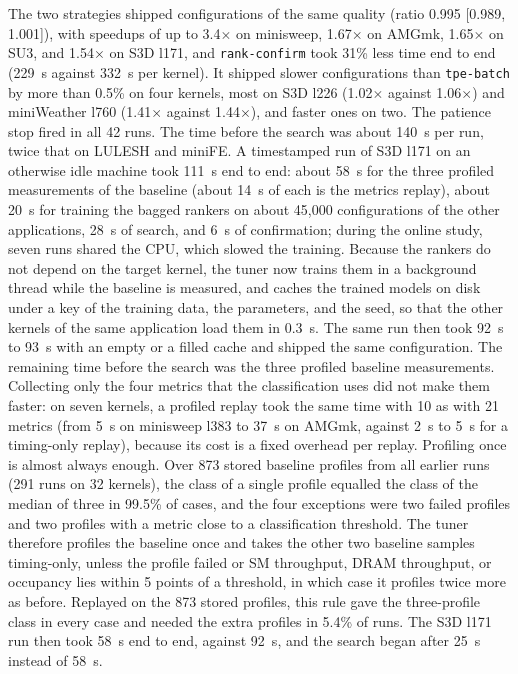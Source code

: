 \documentclass[10pt]{article}
\newcommand{\x}{\ensuremath{\times}}
\newcommand{\code}[1]{\texttt{#1}}
\begin{document}
The two strategies shipped configurations of the same quality (ratio 0.995
[0.989, 1.001]), with speedups of up to 3.4\x{} on minisweep, 1.67\x{} on AMGmk,
1.65\x{} on SU3, and 1.54\x{} on S3D l171, and \code{rank-confirm} took 31\%
less time end to end (229~s against 332~s per kernel). It shipped slower
configurations than \code{tpe-batch} by more than 0.5\% on four kernels, most on
S3D l226 (1.02\x{} against 1.06\x{}) and miniWeather l760 (1.41\x{} against
1.44\x{}), and faster ones on two. The patience stop fired in all 42 runs. The
time before the search was about 140~s per run, twice that on LULESH and
miniFE. A timestamped run of S3D l171 on an otherwise idle machine took 111~s
end to end: about 58~s for the three profiled measurements of the baseline
(about 14~s of each is the metrics replay), about 20~s for training the bagged
rankers on about 45{,}000 configurations of the other applications, 28~s of
search, and 6~s of confirmation; during the online study, seven runs shared
the CPU, which slowed the training. Because the rankers do not depend on the
target kernel, the tuner now trains them in a background thread while the
baseline is measured, and caches the trained models on disk under a key of the
training data, the parameters, and the seed, so that the other kernels of the
same application load them in 0.3~s. The same run then took 92~s to 93~s
with an empty or a filled cache and shipped the same configuration. The
remaining time before the search was the three profiled baseline
measurements. Collecting only the four metrics that the classification uses
did not make them faster: on seven kernels, a profiled replay took the same
time with 10 as with 21 metrics (from 5~s on minisweep l383 to 37~s on AMGmk,
against 2~s to 5~s for a timing-only replay), because its cost is a fixed
overhead per replay. Profiling once is almost always enough. Over 873 stored
baseline profiles from all earlier runs (291 runs on 32 kernels), the class of
a single profile equalled the class of the median of three in 99.5\% of
cases, and the four exceptions were two failed profiles and two profiles with
a metric close to a classification threshold. The tuner therefore profiles
the baseline once and takes the other two baseline samples timing-only,
unless the profile failed or SM throughput, DRAM throughput, or occupancy lies
within 5 points of a threshold, in which case it profiles twice more as
before. Replayed on the 873 stored profiles, this rule gave the three-profile
class in every case and needed the extra profiles in 5.4\% of runs. The S3D
l171 run then took 58~s end to end, against 92~s, and the search began after
25~s instead of 58~s.
\end{document}
